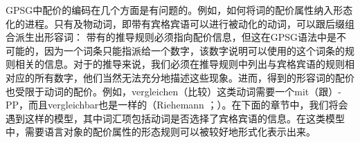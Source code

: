 GPSG中配价的编码在几个方面是有问题的。例如，如何将词的配价属性纳入形态化的进程。只有及物动词，即带有宾格宾语可以进行被动化的动词，可以跟后缀组合派生出形容词：
\eal\settowidth{}
\zl
带有的推导规则必须指向配价信息，但这在GPSG语法中是不可能的，因为一个词条只能指派给一个数字，该数字说明可以使用的这个词条的规则相关的信息。对于的推导来说，我们必须在推导规则中列出与宾格宾语的规则相对应的所有数字，他们当然无法充分地描述这些现象。进而，得到的形容词的配价也受限于动词的配价。例如，vergleichen（比较）这类动词需要一个mit（跟）-PP，而且vergleichbar也是一样的（Riehemann \citeyear[, 54]{Riehemann93a}；\citeyear[]{Riehemann98a}）。在下面的章节中，我们将会遇到这样的模型，其中词汇项包括动词是否选择了宾格宾语的信息。在这类模型中，需要语言对象的配价属性的形态规则可以被较好地形式化表示出来。

